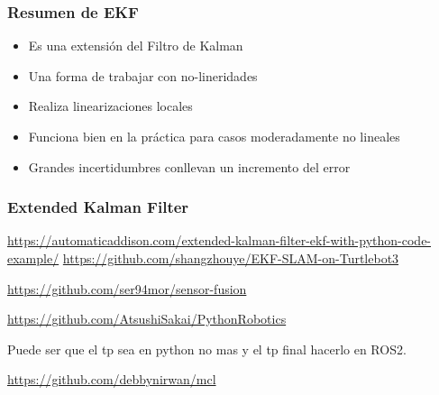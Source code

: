 \begin{frame}
    \frametitle{Resumen de EKF}
    
    \begin{itemize}
        \item Es una extensión del Filtro de Kalman
        \item Una forma de trabajar con no-lineridades
        \item Realiza linearizaciones locales
        \item Funciona bien en la práctica para casos moderadamente no lineales
        \item Grandes incertidumbres conllevan un incremento del error
    \end{itemize}
    
\end{frame}

\begin{frame}
    \frametitle{Extended Kalman Filter}
    
    
    \footnotesize
    \url{https://automaticaddison.com/extended-kalman-filter-ekf-with-python-code-example/}
    \url{https://github.com/shangzhouye/EKF-SLAM-on-Turtlebot3}
    
    \url{https://github.com/ser94mor/sensor-fusion}
    
    \url{https://github.com/AtsushiSakai/PythonRobotics}
    
    Puede ser que el tp sea en python no mas y el tp final hacerlo en ROS2.
    
    \url{https://github.com/debbynirwan/mcl}
    
    
\end{frame}
